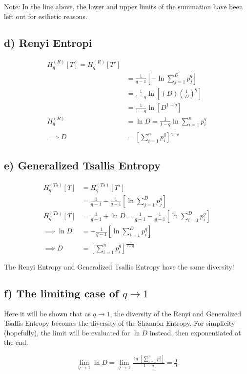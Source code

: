 \documentclass{article}
\begin{document}
Note: In the line above, the lower and upper limits of the summation have been left out for esthetic reasons.

\subsection{d) Renyi Entropi}
\begin{align}
H_{q}^{(R)}[T] = H_{q}^{(R)}[T'] \\
&= \frac{1}{q-1} [-\ln \sum_{j=1}^D p_j^q] \\
&= \frac{1}{1-q}\ln [(D)(\frac{1}{D})^q] \\
&= \frac{1}{1-q} \ln [D^{1-q}] \\
H_q^{(R)} &= \ln D = \frac{1}{1-q} \ln \sum_{i=1}^{n} p_i^q \\
\implies D &= [\sum_{i=1}^n p_i^q]^{\frac{1}{1-q}}
\end{align}
\subsection{e) Generalized Tsallis Entropy}

\begin{align}
H_q^{(Ts)} [T] &= H_q^{(Ts)} [T'] \\
&= \frac{1}{q-1} - \frac{1}{q-1} [\ln \sum_{j=1}^D p_j^q]  \\
H_q^{(Ts)} [T] &= \frac{1}{q-1} + \ln D = \frac{1}{q-1} - \frac{1}{q-1} [\ln \sum_{i=1}^D p_i^q] \\
\implies \ln D &= - \frac{1}{q-1} [\ln \sum_{i=1}^D p_i^q] \\
\implies D &=  [\sum_{i=1}^n p_i^q]^{\frac{1}{1-q}}
\end{align}

The Renyi Entropy and Generalized Tsallis Entropy have the same diversity!

\subsection{f) The limiting case of $q \to 1$}

Here it will be shown that as $q\to1$, the diversity of the Renyi and Generalized Tsallis Entropy becomes the diversity of the Shannon Entropy. For simplicity (hopefully), the limit will be evaluated for $\ln D$ instead, then exponentiated at the end.

\begin{align}
\lim_{q\to1} \ln D = \lim_{q \to 1} \frac{\ln[\sum_{i=1}^n p_i^q]}{1-q} = \frac{0}{0}
\end{align}
\end{document}
